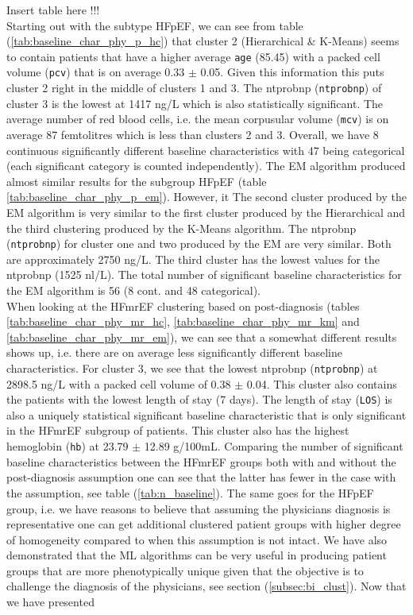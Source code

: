 \documentclass[../thesis.tex]{subfiles}
\begin{document}
\noindent Insert table here !!!\\









\indent Starting out with the subtype HFpEF, we can see from table (\ref{tab:baseline_char_phy_p_hc}) that cluster 2 (Hierarchical \& K-Means) seems to contain patients that have a higher average \texttt{age} (85.45) with a packed cell volume (\texttt{pcv}) that is on average 0.33 $\pm$ 0.05. Given this information this puts cluster 2 right in the middle of clusters 1 and 3. The ntprobnp (\texttt{ntprobnp}) of cluster 3 is the lowest at 1417 ng/L which is also statistically significant. The average number of red blood cells, i.e. the mean corpusular volume (\texttt{mcv}) is on average 87 femtolitres which is less than clusters 2 and 3. Overall, we have 8 continuous significantly different baseline characteristics with 47 being categorical (each significant category is counted independently). The EM algorithm produced almost similar results for the subgroup HFpEF (table \ref{tab:baseline_char_phy_p_em}). However, it  The second cluster produced by the EM algorithm is very similar to the first cluster produced by the Hierarchical and the third clustering produced by the K-Means algorithm. The ntprobnp (\texttt{ntprobnp}) for cluster one and two produced by the EM are very similar. Both are approximately 2750 ng/L. The third cluster has the lowest values for the ntprobnp (1525 nl/L). The total number of significant baseline characteristics for the EM algorithm is 56 (8 cont. and 48 categorical).\\ \indent When looking at the HFmrEF clustering based on post-diagnosis (tables \ref{tab:baseline_char_phy_mr_hc}, \ref{tab:baseline_char_phy_mr_km} and \ref{tab:baseline_char_phy_mr_em}), we can see that a somewhat different results shows up, i.e. there are on average less significantly different baseline characteristics. For cluster 3, we see that the lowest ntprobnp (\texttt{ntprobnp}) at 2898.5 ng/L with a packed cell volume of 0.38 $\pm$ 0.04. This cluster also contains the patients with the lowest length of stay (7 days). The length of stay (\texttt{LOS}) is also a uniquely statistical significant baseline characteristic that is only significant in the HFmrEF subgroup of patients. This cluster also has the highest hemoglobin (\texttt{hb}) at 23.79 $\pm$ 12.89 g/100mL. Comparing the number of significant baseline characteristics between the HFmrEF groups both with and without the post-diagnosis assumption one can see that the latter has fewer in the case with the assumption, see table (\ref{tab:n_baseline}). The same goes for the HFpEF group, i.e. we have reasons to believe that assuming the physicians diagnosis is representative one can get additional clustered patient groups with higher degree of homogeneity compared to when this assumption is not intact. We have also demonstrated that the ML algorithms can be very useful in producing patient groups that are more phenotypically unique given that the objective is to challenge the diagnosis of the physicians, see section (\ref{subsec:bi_clust}). Now that we have presented 
\end{document}
